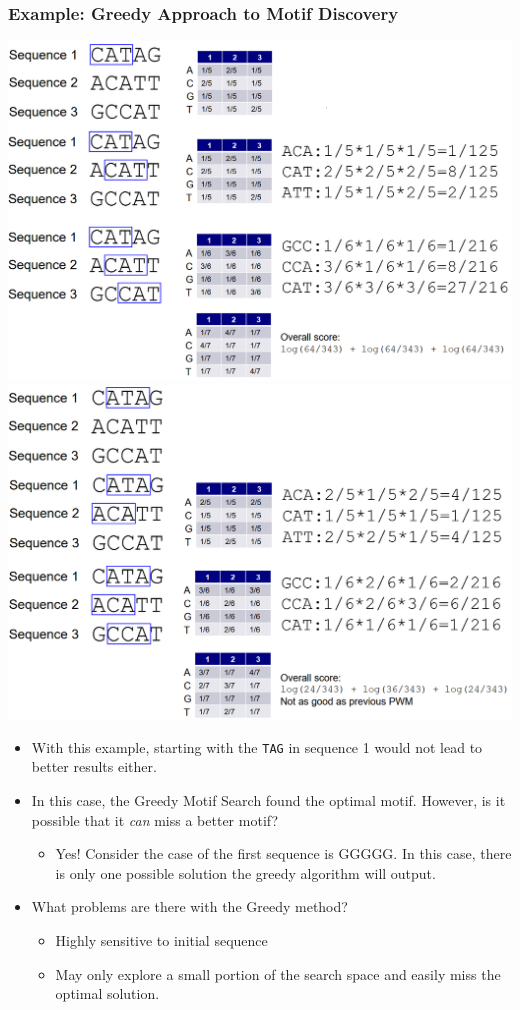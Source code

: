 \documentclass[10pt]{article}
\begin{document}
\subsubsection*{Example: Greedy Approach to Motif Discovery}
\begin{center} 
	\includegraphics*[width=\textwidth]{W7_22.png} \\
    \includegraphics*[width=\textwidth]{W7_23.png} 
\end{center}
\begin{itemize}
	\item With this example, starting with the \texttt{TAG} in sequence 1 would not lead to better results either.  
	\item In this case, the Greedy Motif Search found the optimal motif.  However, is it possible that it \textit{can} miss a better motif?
	\begin{itemize}
        \item Yes!  Consider the case of the first sequence is GGGGG.  In this case, there is only one possible solution the greedy algorithm will output.
    \end{itemize}
    \item What problems are there with the Greedy method?
    \begin{itemize}
        \item Highly sensitive to initial sequence
        \item May only explore a small portion of the search space and easily miss the optimal solution.
    \end{itemize}
\end{itemize}
\end{document}
